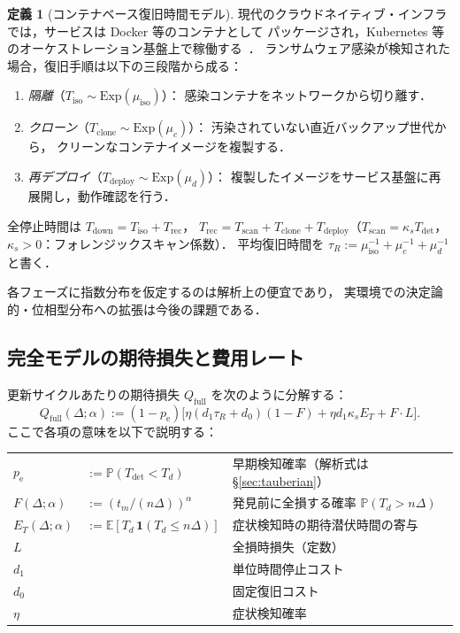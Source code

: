\documentclass[12pt,a4paper]{article}
\theoremstyle{plain}
\theoremstyle{definition}
\newtheorem{definition}[theorem]{定義}
\theoremstyle{remark}
\newcommand{\E}{\mathbb{E}}
\newcommand{\Prob}{\mathbb{P}}
\newcommand{\pe}{p_{\mathrm{e}}}
\newcommand{\Qf}{Q_{\mathrm{full}}}
\newcommand{\Tdet}{T_{\mathrm{det}}}
\newcommand{\Trec}{T_{\mathrm{rec}}}
\newcommand{\Tdown}{T_{\mathrm{down}}}
\begin{document}
\begin{definition}[コンテナベース復旧時間モデル]\label{def:recovery}
現代のクラウドネイティブ・インフラでは，サービスは Docker 等のコンテナとして
パッケージされ，Kubernetes 等のオーケストレーション基盤上で稼働する~\cite{nist80034,cisa2020}．
ランサムウェア感染が検知された場合，復旧手順は以下の三段階から成る：
\begin{enumerate}[leftmargin=2em,label=(\roman*)]
  \item \emph{隔離}（$T_{\mathrm{iso}}\sim\mathrm{Exp}(\mu_{\mathrm{iso}})$）：
    感染コンテナをネットワークから切り離す．
  \item \emph{クローン}（$T_{\mathrm{clone}}\sim\mathrm{Exp}(\mu_c)$）：
    汚染されていない直近バックアップ世代から，
    クリーンなコンテナイメージを複製する．
  \item \emph{再デプロイ}（$T_{\mathrm{deploy}}\sim\mathrm{Exp}(\mu_d)$）：
    複製したイメージをサービス基盤に再展開し，動作確認を行う．
\end{enumerate}
全停止時間は $\Tdown=T_{\mathrm{iso}}+\Trec$，
$\Trec=T_{\mathrm{scan}}+T_{\mathrm{clone}}+T_{\mathrm{deploy}}$（$T_{\mathrm{scan}}=\kappa_s\Tdet$，$\kappa_s>0$：フォレンジックスキャン係数）．
平均復旧時間を $\tau_R:=\mu_{\mathrm{iso}}^{-1}+\mu_c^{-1}+\mu_d^{-1}$ と書く．

各フェーズに指数分布を仮定するのは解析上の便宜であり，
実環境での決定論的・位相型分布への拡張は今後の課題である．
\end{definition}

\subsection{完全モデルの期待損失と費用レート}

更新サイクルあたりの期待損失 $\Qf$ を次のように分解する：
\begin{equation}\label{eq:Qfull}
\Qf(\Delta;\alpha)
:=(1-\pe)\bigl[\eta(d_1\tau_R+d_0)(1-F)+\eta d_1\kappa_s E_T+F\cdot L\bigr].
\end{equation}
ここで各項の意味を以下で説明する：

\medskip
\begin{tabular}{@{}ll p{88mm}@{}}
$\pe$ & $:=\Prob(\Tdet<T_d)$ & 早期検知確率（解析式は \S\ref{sec:tauberian}）\\
$F(\Delta;\alpha)$ & $:=(t_m/(n\Delta))^\alpha$ & 発見前に全損する確率 $\Prob(T_d>n\Delta)$ \\
$E_T(\Delta;\alpha)$ & $:=\E[T_d\,\mathbf{1}(T_d\le n\Delta)]$ & 症状検知時の期待潜伏時間の寄与 \\
$L$ & & 全損時損失（定数）\\
$d_1$ & & 単位時間停止コスト\\
$d_0$ & & 固定復旧コスト\\
$\eta$ & & 症状検知確率\\
\end{tabular}
\medskip
\end{document}
